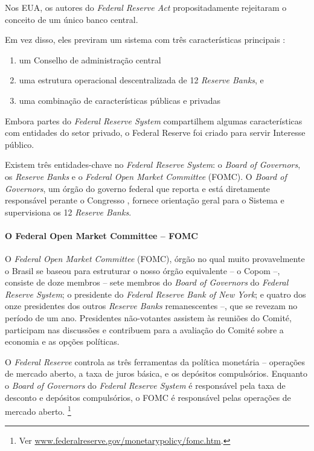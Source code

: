 \documentclass[]{article}
\providecommand{\tightlist}{%
  \setlength{\itemsep}{0pt}\setlength{\parskip}{0pt}}
\let\oldparagraph\paragraph
\renewcommand{\paragraph}[1]{\oldparagraph{#1}\mbox{}}
\let\rmarkdownfootnote\footnote%
\def\footnote{\protect\rmarkdownfootnote}
\begin{document}
Nos EUA, os autores do \emph{Federal Reserve Act} propositadamente
rejeitaram o conceito de um único banco central.

Em vez disso, eles previram um sistema com três características
principais \cite{fed1}:

\begin{enumerate}
\def\labelenumi{\arabic{enumi}.}
\tightlist
\item
  um Conselho de administração central
\item
  uma estrutura operacional descentralizada de 12 \emph{Reserve Banks},
  e
\item
  uma combinação de características públicas e privadas
\end{enumerate}

Embora partes do \emph{Federal Reserve System} compartilhem algumas
características com entidades do setor privado, o Federal Reserve foi
criado para servir Interesse público.

Existem três entidades-chave no \emph{Federal Reserve System}: o
\emph{Board of Governors}, os \emph{Reserve Banks} e o \emph{Federal
Open Market Committee} (FOMC). O \emph{Board of Governors}, um órgão do
governo federal que reporta e está diretamente responsável perante o
Congresso , fornece orientação geral para o Sistema e supervisiona os 12
\emph{Reserve Banks}.

\paragraph{O Federal Open Market Committee --
FOMC}\label{o-federal-open-market-committee-fomc}

O \emph{Federal Open Market Committee} (FOMC), órgão no qual muito
provavelmente o Brasil se baseou para estruturar o nosso órgão
equivalente -- o Copom --, consiste de doze membros -- sete membros do
\emph{Board of Governors} do \emph{Federal Reserve System}; o presidente
do \emph{Federal Reserve Bank of New York}; e quatro dos onze
presidentes dos outros \emph{Reserve Banks} remanescentes --, que se
revezam no período de um ano. Presidentes não-votantes assistem às
reuniões do Comité, participam nas discussões e contribuem para a
avaliação do Comité sobre a economia e as opções políticas.

O \emph{Federal Reserve} controla as três ferramentas da política
monetária -- operações de mercado aberto, a taxa de juros básica, e os
depósitos compulsórios. Enquanto o \emph{Board of Governors} do
\emph{Federal Reserve System} é responsável pela taxa de desconto e
depósitos compulsórios, o FOMC é responsável pelas operações de mercado
aberto. \footnote{Ver
  \href{https://www.federalreserve.gov/monetarypolicy/fomc.htm}{www.federalreserve.gov/monetarypolicy/fomc.htm}.}
\end{document}
